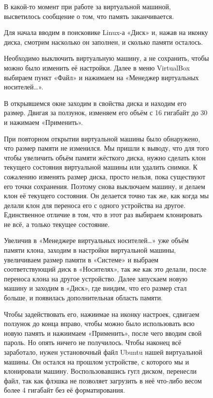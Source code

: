 \begin{figure}
\quad В какой-то момент при работе за виртуальной машиной, высветилось сообщение о том, что память заканчивается. 
\end{figure}

\begin{figure}
\quad Для начала вводим в поисковике Linux-а «Диск» и, нажав на иконку диска, смотрим насколько он заполнен, и сколько памяти осталось. 
\end{figure}

\begin{figure}
\quad Необходимо выключить виртуальную машину, а не сохранить, чтобы можно было изменить её настройки. Далее в меню VirtualBox выбираем пункт «Файл» и нажимаем на «Менеджер виртуальных носителей…».
\end{figure}

\begin{figure}
\quad В открывшемся окне заходим в свойства диска и находим его размер. Двигая за ползунок, изменяем его объём с 16 гигабайт до 30 и нажимаем «Применить». 
\end{figure}

\begin{figure}
\quad При повторном открытии виртуальной машины было обнаружено, что размер памяти не изменился. Мы пришли к выводу, что для того чтобы увеличить объём памяти жёсткого диска, нужно сделать клон текущего состояния виртуальной машины или удалить снимки. К сожалению изменять размер диска, просто нельзя, пока существуют его точки сохранения. Поэтому снова выключаем машину, и делаем клон её текущего состояния. Он делается точно так же, как когда мы делали клон для переноса его с одного устройства на другое. Единственное отличие в том, что в этот раз выбираем клонировать не всё, а только текущее состояние. 
\end{figure}

\begin{figure}
\quad Увеличив в «Менеджере виртуальных носителей…» уже объём памяти клона, заходим в настройки виртуальной машины, увеличиваем размер памяти в «Системе» и выбраем соответствующий диск в «Носителях», так же как это делали, после переноса клона на другое устройство. Далее запускаем новую машину и заходим в «Диск», где виидим, что его размер стал больше, и появилась дополнительная область памяти.
\end{figure}

\begin{figure}
\quad Чтобы задействовать его, нажиимае на иконку настроек, сдвигаем ползунок до конца вправо, чтобы можно было использовать всю новую память и нажиимаем «Применить», после чего вводим свой пароль. Но опять ничего не получилось. Чтобы наконец всё заработало, нужен установочный файл Ubuntu нашей виртуальной машины. Он остался на прошлом устройстве, с которого мы и клонировали машину. Воспользовавшись гугл диском, перенесли файл, так как флэшка не позволяет загрузить в неё что-либо весом более 4 гигабайт без её форматирования.
\end{figure}